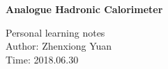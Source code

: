 

\thispagestyle{empty}
\begin{center}
  \renewcommand{\baselinestretch}{2.00}
  \Large\bfseries\sffamily
  \vspace*{2cm}
    Analogue Hadronic Calorimeter
  \par
  \vfill
  \large\normalfont
  Personal learning notes\\
  Author: Zhenxiong Yuan\\
  Time: 2018.06.30
\end{center}\par

\renewcommand{\baselinestretch}{1.00}\normalsize